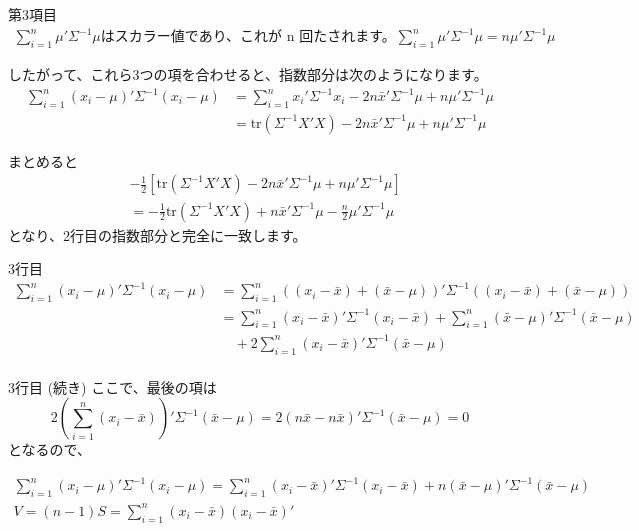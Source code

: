 \documentclass[aspectratio=169]{beamer}
\begin{document}
\begin{frame}{第3項目}
\begin{align*}
\sum_{i=1}^n \mu'\Sigma^{-1}\mu\text{はスカラー値であり、これが n 回たされます。}
\sum_{i=1}^n \mu'\Sigma^{-1}\mu 
= n\mu'\Sigma^{-1}\mu
\end{align*}

したがって、これら3つの項を合わせると、指数部分は次のようになります。
\begin{align*}
\sum_{i=1}^n (x_i - \mu)'\Sigma^{-1}(x_i - \mu)
&= \sum_{i=1}^n x_i'\Sigma^{-1}x_i - 2n\bar{x}'\Sigma^{-1}\mu + n\mu'\Sigma^{-1}\mu \\
&= \mathrm{tr}(\Sigma^{-1} X'X) - 2n\bar{x}'\Sigma^{-1}\mu + n\mu'\Sigma^{-1}\mu
\end{align*}

\end{frame}

\begin{frame}{まとめると}
    \begin{align*}
    & -\frac{1}{2} \left[ \mathrm{tr}(\Sigma^{-1} X'X) - 2n\bar{x}'\Sigma^{-1}\mu + n\mu'\Sigma^{-1}\mu \right] \\
    &= -\frac{1}{2} \mathrm{tr}(\Sigma^{-1} X'X) + n\bar{x}'\Sigma^{-1}\mu - \frac{n}{2} \mu'\Sigma^{-1}\mu
    \end{align*}
    となり、2行目の指数部分と完全に一致します。
\end{frame}

\begin{frame}{3行目}
\begin{align*}
\sum_{i=1}^n (x_i - \mu)' \Sigma^{-1} (x_i - \mu)
&= \sum_{i=1}^n \left( (x_i - \bar{x}) + (\bar{x} - \mu) \right)' \Sigma^{-1} \left( (x_i - \bar{x}) + (\bar{x} - \mu) \right) \\
&= \sum_{i=1}^n (x_i - \bar{x})' \Sigma^{-1} (x_i - \bar{x}) + \sum_{i=1}^n (\bar{x} - \mu)' \Sigma^{-1} (\bar{x} - \mu) \\
&\quad + 2\sum_{i=1}^n (x_i - \bar{x})' \Sigma^{-1} (\bar{x} - \mu)\\
\end{align*}
\end{frame}

\begin{frame}{3行目 (続き)}
ここで、最後の項は
\[
2\left(\sum_{i=1}^n (x_i - \bar{x})\right)' \Sigma^{-1} (\bar{x} - \mu) = 2(n\bar{x} - n\bar{x})' \Sigma^{-1} (\bar{x} - \mu) = 0
\]
となるので、

\begin{align*}
\sum_{i=1}^n (x_i - \mu)' \Sigma^{-1} (x_i - \mu)
= \sum_{i=1}^n (x_i - \bar{x})' \Sigma^{-1} (x_i - \bar{x}) + n(\bar{x} - \mu)' \Sigma^{-1} (\bar{x} - \mu)\\
V = (n-1)S = \sum_{i=1}^n (x_i - \bar{x})(x_i - \bar{x})'
\end{align*}
\end{frame}
\end{document}
